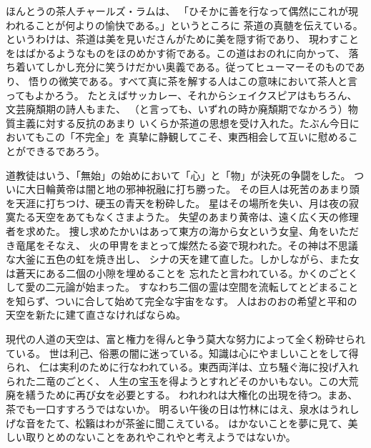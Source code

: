 \documentclass[a4paper, platex, dvipdfmx]{jsarticle}
\begin{document}
ほんとうの茶人チャールズ・ラムは、
「ひそかに善を行なって偶然にこれが現われることが何よりの愉快である。」というところに
茶道の真髄を伝えている。というわけは、茶道は美を見いださんがために美を隠す術であり、
現わすことをはばかるようなものをほのめかす術である。この道はおのれに向かって、
落ち着いてしかし充分に笑うけだかい奥義である。従ってヒューマーそのものであり、
悟りの微笑である。すべて真に茶を解する人はこの意味において茶人と言ってもよかろう。
たとえばサッカレー、それからシェイクスピアはもちろん、文芸廃頽期の詩人もまた、
（と言っても、いずれの時か廃頽期でなかろう）物質主義に対する反抗のあまり
いくらか茶道の思想を受け入れた。たぶん今日においてもこの「不完全」を
真摯に静観してこそ、東西相会して互いに慰めることができるであろう。

道教徒はいう、「無始」の始めにおいて「心」と「物」が決死の争闘をした。
ついに大日輪黄帝は闇と地の邪神祝融に打ち勝った。
その巨人は死苦のあまり頭を天涯に打ちつけ、硬玉の青天を粉砕した。
星はその場所を失い、月は夜の寂寞たる天空をあてもなくさまようた。
失望のあまり黄帝は、遠く広く天の修理者を求めた。
捜し求めたかいはあって東方の海から女という女皇、角をいただき竜尾をそなえ、
火の甲冑をまとって燦然たる姿で現われた。その神は不思議な大釜に五色の虹を焼き出し、
シナの天を建て直した。しかしながら、また女は蒼天にある二個の小隙を埋めることを
忘れたと言われている。かくのごとくして愛の二元論が始まった。
すなわち二個の霊は空間を流転してとどまることを知らず、ついに合して始めて完全な宇宙をなす。
人はおのおの希望と平和の天空を新たに建て直さなければならぬ。

現代の人道の天空は、富と権力を得んと争う莫大な努力によって全く粉砕せられている。
世は利己、俗悪の闇に迷っている。知識は心にやましいことをして得られ、
仁は実利のために行なわれている。東西両洋は、立ち騒ぐ海に投げ入れられた二竜のごとく、
人生の宝玉を得ようとすれどそのかいもない。この大荒廃を繕うために再び女を必要とする。
われわれは大権化の出現を待つ。まあ、茶でも一口すすろうではないか。
明るい午後の日は竹林にはえ、泉水はうれしげな音をたて、松籟はわが茶釜に聞こえている。
はかないことを夢に見て、美しい取りとめのないことをあれやこれやと考えようではないか。
\end{document}
